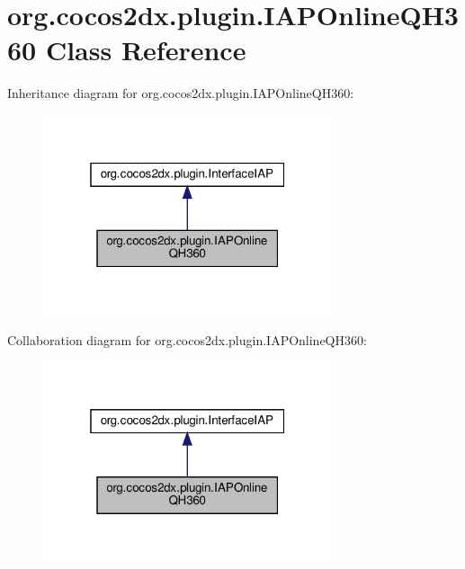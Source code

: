 \hypertarget{classorg_1_1cocos2dx_1_1plugin_1_1IAPOnlineQH360}{}\section{org.\+cocos2dx.\+plugin.\+I\+A\+P\+Online\+Q\+H360 Class Reference}
\label{classorg_1_1cocos2dx_1_1plugin_1_1IAPOnlineQH360}


Inheritance diagram for org.\+cocos2dx.\+plugin.\+I\+A\+P\+Online\+Q\+H360\+:
\nopagebreak
\begin{figure}[H]
\begin{center}
\leavevmode
\includegraphics[width=241pt]{classorg_1_1cocos2dx_1_1plugin_1_1IAPOnlineQH360__inherit__graph}
\end{center}
\end{figure}


Collaboration diagram for org.\+cocos2dx.\+plugin.\+I\+A\+P\+Online\+Q\+H360\+:
\nopagebreak
\begin{figure}[H]
\begin{center}
\leavevmode
\includegraphics[width=241pt]{classorg_1_1cocos2dx_1_1plugin_1_1IAPOnlineQH360__coll__graph}
\end{center}
\end{figure}
